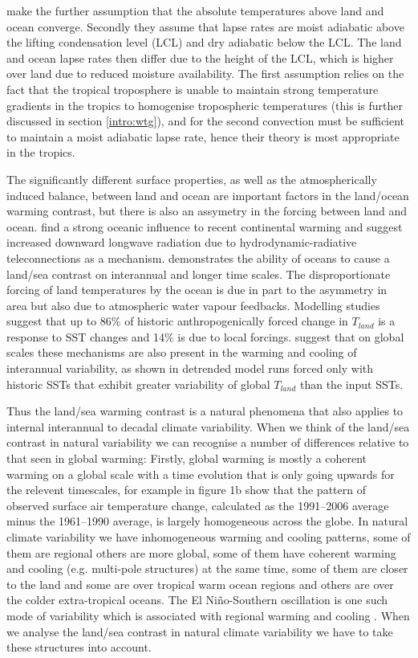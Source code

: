 \citet{Byrne2013a} make the further assumption that the absolute temperatures 
above land and ocean converge. Secondly they assume that lapse rates are moist 
adiabatic above the lifting condensation level (LCL) and dry adiabatic below the 
LCL. The land and ocean lapse rates then differ due to the height of the LCL, 
which is higher over land due to reduced moisture availability. The first 
assumption relies on the fact that the tropical troposphere is unable to 
maintain strong temperature gradients in the tropics to homogenise tropospheric 
temperatures (this is further discussed in section \ref{intro:wtg}), and for the 
second convection must be sufficient to maintain a moist adiabatic lapse rate, 
hence their theory is most appropriate in the tropics.

The significantly different surface properties, as well as the atmospherically 
induced balance, between land and ocean are important factors in the land/ocean 
warming contrast, but there is also an assymetry in the forcing between land and 
ocean.  \citet{Compo2008} find a strong oceanic influence to recent continental 
warming and suggest increased downward longwave radiation due to 
hydrodynamic-radiative teleconnections as a mechanism.  \citet{Dommenget2009} 
demonstrates the ability of oceans to cause a land/sea contrast on interannual 
and longer time scales.  The disproportionate forcing of land temperatures by 
the ocean is due in part to the asymmetry in area but also due to atmospheric 
water vapour feedbacks.  Modelling studies suggest that up to 86\% of historic 
anthropogenically forced change in $T_{land}$ is a response to SST changes and 
14\% is due to local forcings. \citet{Dommenget2009} suggest that on global 
scales these mechanisms are also present in the warming and cooling of 
interannual variability, as shown in detrended model runs forced only with 
historic SSTs that exhibit greater variability of global $T_{land}$ than the 
input SSTs.

Thus the land/sea warming contrast is a natural phenomena that also applies to 
internal interannual to decadal climate variability.  When we think of the 
land/sea contrast in natural variability we can recognise a number of 
differences relative to that seen in global warming: Firstly, global warming is 
mostly a coherent warming on a global scale with a time evolution that is only 
going upwards for the relevent timescales, for example \citet{Compo2008} in 
figure 1b show that the pattern of observed surface air temperature change, 
calculated as the 1991--2006 average minus the 1961--1990 average, is largely 
homogeneous across the globe. In natural climate variability we have 
inhomogeneous warming and cooling patterns, some of them are regional others are 
more global, some of them have coherent warming and cooling (e.g.  multi-pole 
structures) at the same time, some of them are closer to the land and some are 
over tropical warm ocean regions and others are over the colder extra-tropical 
oceans. The El Ni{\~n}o-Southern oscillation is one such mode of variability 
which is associated with regional warming and cooling \citep{Halpert1992}. When 
we analyse the land/sea contrast in natural climate variability we have to take 
these structures into account.

